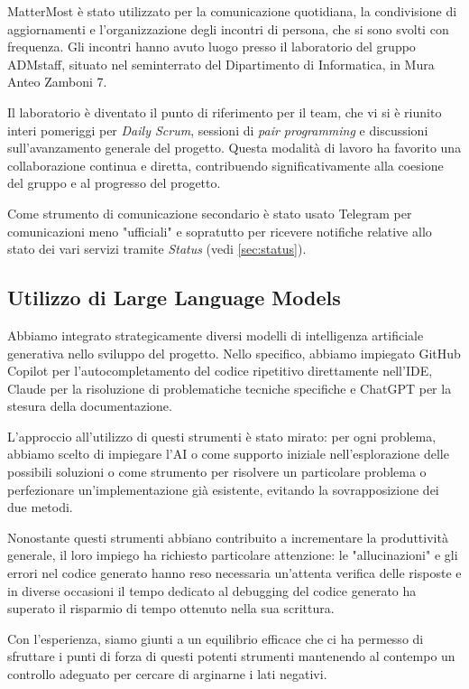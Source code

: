 \documentclass{article}
\begin{document}
MatterMost è stato utilizzato per la comunicazione quotidiana, la condivisione di aggiornamenti e l'organizzazione degli incontri di persona, 
che si sono svolti con frequenza. Gli incontri hanno avuto luogo presso il laboratorio del gruppo ADMstaff, situato nel seminterrato del 
Dipartimento di Informatica, in Mura Anteo Zamboni 7.

Il laboratorio è diventato il punto di riferimento per il team, che vi si è riunito interi pomeriggi per \textit{Daily Scrum}, sessioni di \textit{pair programming} 
e discussioni sull'avanzamento generale del progetto. Questa modalità di lavoro ha favorito una collaborazione continua e diretta, contribuendo 
significativamente alla coesione del gruppo e al progresso del progetto.

Come strumento di comunicazione secondario è stato usato Telegram per comunicazioni meno "ufficiali" e sopratutto per ricevere notifiche relative 
allo stato dei vari servizi tramite \textit{Status} (vedi \ref{sec:status}).

\subsection{Utilizzo di Large Language Models}

Abbiamo integrato strategicamente diversi modelli di intelligenza artificiale generativa nello sviluppo del progetto. Nello specifico, abbiamo 
impiegato GitHub Copilot per l'autocompletamento del codice ripetitivo direttamente nell'IDE, Claude per la risoluzione di problematiche tecniche 
specifiche e ChatGPT per la stesura della documentazione.

L'approccio all'utilizzo di questi strumenti è stato mirato: per ogni problema, abbiamo scelto di impiegare l'AI o come supporto iniziale 
nell'esplorazione delle possibili soluzioni o come strumento per risolvere un particolare problema o perfezionare un'implementazione già esistente, 
evitando la sovrapposizione dei due metodi.

Nonostante questi strumenti abbiano contribuito a incrementare la produttività generale, il loro impiego ha richiesto particolare attenzione: le 
"allucinazioni" e gli errori nel codice generato hanno reso necessaria un'attenta verifica delle risposte e in diverse occasioni il tempo dedicato 
al debugging del codice generato ha superato il risparmio di tempo ottenuto nella sua scrittura.

Con l'esperienza, siamo giunti a un equilibrio efficace che ci ha permesso di sfruttare i punti di forza di questi potenti strumenti mantenendo al 
contempo un controllo adeguato per cercare di arginarne i lati negativi.
\end{document}
